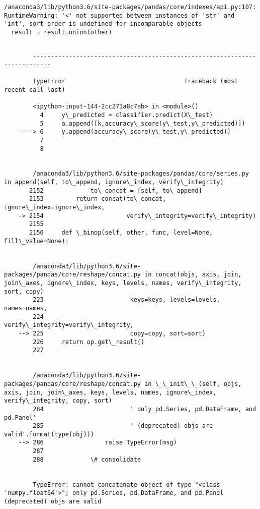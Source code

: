 \documentclass[11pt]{article}
\begin{document}
    \begin{Verbatim}[commandchars=\\\{\}]
/anaconda3/lib/python3.6/site-packages/pandas/core/indexes/api.py:107: RuntimeWarning: '<' not supported between instances of 'str' and 'int', sort order is undefined for incomparable objects
  result = result.union(other)

    \end{Verbatim}

    \begin{Verbatim}[commandchars=\\\{\}]

        ---------------------------------------------------------------------------

        TypeError                                 Traceback (most recent call last)

        <ipython-input-144-2cc271a8c7ab> in <module>()
          4     y\_predicted = classifier.predict(X\_test)
          5     a.append([k,accuracy\_score(y\_test,y\_predicted)])
    ----> 6     y.append(accuracy\_score(y\_test,y\_predicted))
          7 
          8 


        /anaconda3/lib/python3.6/site-packages/pandas/core/series.py in append(self, to\_append, ignore\_index, verify\_integrity)
       2152             to\_concat = [self, to\_append]
       2153         return concat(to\_concat, ignore\_index=ignore\_index,
    -> 2154                       verify\_integrity=verify\_integrity)
       2155 
       2156     def \_binop(self, other, func, level=None, fill\_value=None):


        /anaconda3/lib/python3.6/site-packages/pandas/core/reshape/concat.py in concat(objs, axis, join, join\_axes, ignore\_index, keys, levels, names, verify\_integrity, sort, copy)
        223                        keys=keys, levels=levels, names=names,
        224                        verify\_integrity=verify\_integrity,
    --> 225                        copy=copy, sort=sort)
        226     return op.get\_result()
        227 


        /anaconda3/lib/python3.6/site-packages/pandas/core/reshape/concat.py in \_\_init\_\_(self, objs, axis, join, join\_axes, keys, levels, names, ignore\_index, verify\_integrity, copy, sort)
        284                        ' only pd.Series, pd.DataFrame, and pd.Panel'
        285                        ' (deprecated) objs are valid'.format(type(obj)))
    --> 286                 raise TypeError(msg)
        287 
        288             \# consolidate


        TypeError: cannot concatenate object of type "<class 'numpy.float64'>"; only pd.Series, pd.DataFrame, and pd.Panel (deprecated) objs are valid

    \end{Verbatim}
\end{document}
